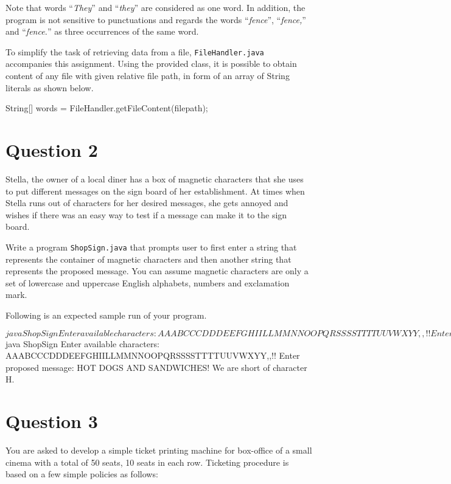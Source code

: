 Note that words ``\textit{They}'' and ``\textit{they}'' are considered as one word.
In addition, the program is not sensitive to punctuations and regards the words ``\textit{fence}'', ``\textit{fence,}'' and ``\textit{fence.}'' as three occurrences of the same word.

To simplify the task of retrieving data from a file, \texttt{FileHandler.java} accompanies this assignment.
Using the provided class, it is possible to obtain content of any file with given relative file path, in form of an array of String literals as shown below.

\begin{terminal}
String[] words = FileHandler.getFileContent(filepath);
\end{terminal}

\section*{Question 2}

Stella, the owner of a local diner has a box of magnetic characters that she uses to put different messages on the sign board of her establishment.
At times when Stella runs out of characters for her desired messages, she gets annoyed and wishes if there was an easy way to test if a message can make it to the sign board.

Write a program \texttt{ShopSign.java} that prompts user to first enter a string that represents the container of magnetic characters and then another string that represents the proposed message.
You can assume magnetic characters are only a set of lowercase and uppercase English alphabets, numbers and exclamation mark.

Following is an expected sample run of your program.

\begin{terminal}
$ java ShopSign
Enter available characters:
AAABCCCDDDEEFGHIILLMMNNOOPQRSSSSTTTTUUVWXYY,,!!
Enter proposed message: HOT DOGS AND BUNS!
The message makes it to the sign board.
$ java ShopSign
Enter available characters:
AAABCCCDDDEEFGHIILLMMNNOOPQRSSSSTTTTUUVWXYY,,!!
Enter proposed message: HOT DOGS AND SANDWICHES!
We are short of character H.
\end{terminal}

\section*{Question 3}

You are asked to develop a simple ticket printing machine for box-office of a small cinema with a total of 50 seats, 10 seats in each row.
Ticketing procedure is based on a few simple policies as follows:

